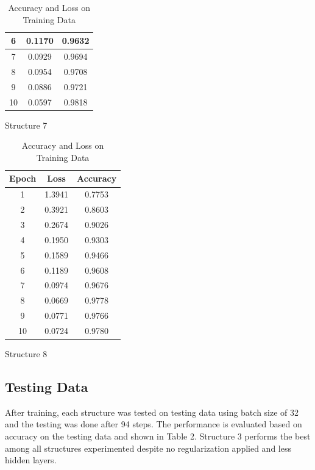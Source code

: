 \documentclass{article}
\begin{document}
\begin{table}[]
\begin{minipage}[b]{0.23\linewidth}
\begin{tabular}{|c|c|c|}
    \hline
    6&0.1170&0.9632\\
    \hline
    7&0.0929&0.9694\\
    \hline
    8&0.0954&0.9708\\
    \hline
    9&0.0886&0.9721\\
    \hline
    10&0.0597&0.9818\\
    \hline
  \end{tabular}
  \caption*{Structure 7}
  \end{minipage}
  \hspace{0.5cm}
  \begin{minipage}[b]{0.23\linewidth}
  \tiny
  \begin{tabular}{|c|c|c|}
    \hline
    Epoch&Loss&Accuracy\\
    \hline
    1&1.3941&0.7753\\
    \hline
    2&0.3921&0.8603\\
    \hline
    3&0.2674&0.9026\\
    \hline
    4&0.1950&0.9303\\
    \hline
    5&0.1589&0.9466\\
    \hline
    6&0.1189&0.9608\\
    \hline
    7&0.0974&0.9676\\
    \hline
    8&0.0669&0.9778\\
    \hline
    9&0.0771&0.9766\\
    \hline
    10&0.0724&0.9780\\
    \hline
  \end{tabular}
  \caption*{Structure 8}
  \end{minipage}
  \caption{Accuracy and Loss on Training Data}
  \label{t1:acc_loss_train_tab}
\end{table}

\subsection{Testing Data}

After training, each structure was tested on testing data using batch size of 32 and the testing was done after 94 steps. The performance is evaluated based on accuracy on the testing data and shown in Table 2. Structure 3 performs the best among all structures experimented despite no regularization applied and less hidden layers.
\end{document}
